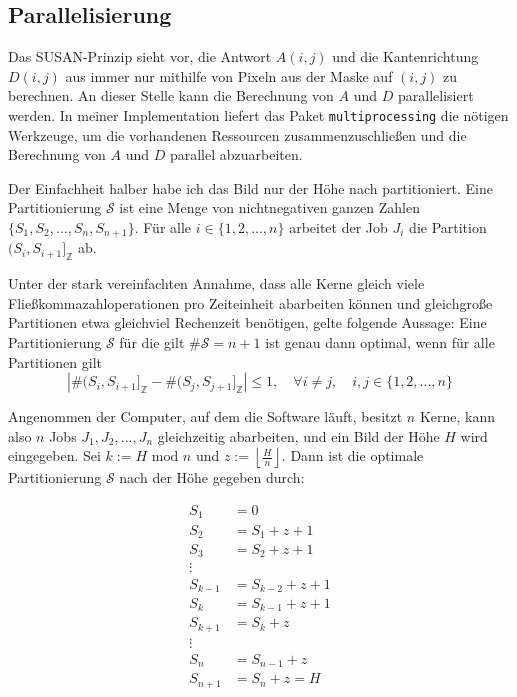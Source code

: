 \documentclass[a4paper, 11pt]{report}
\theoremstyle{definition}
\begin{document}
			\subsection{Parallelisierung}
				Das SUSAN-Prinzip sieht vor, die Antwort $A(i,j)$ und die Kantenrichtung $D(i,j)$ aus  immer nur mithilfe von Pixeln aus der Maske auf $(i,j)$ zu berechnen. An dieser Stelle kann die Berechnung von $A$ und $D$ parallelisiert werden. In meiner Implementation liefert das Paket \texttt{multiprocessing} die nötigen Werkzeuge, um die vorhandenen Ressourcen zusammenzuschließen und die Berechnung von $A$ und $D$ parallel abzuarbeiten.

				Der Einfachheit halber habe ich das Bild nur der Höhe nach partitioniert. Eine Partitionierung $\mathcal{S}$ ist eine Menge von nichtnegativen ganzen Zahlen $\{S_1, S_2, ..., S_n, S_{n+1}\}$. Für alle $i \in \{1,2,...,n\}$ arbeitet der Job $J_i$ die Partition $(S_i, S_{i+1}]_\mathbb{Z}$ ab.

				Unter der stark vereinfachten Annahme, dass alle Kerne gleich viele Fließkommazahloperationen pro Zeiteinheit abarbeiten können und gleichgroße Partitionen etwa gleichviel Rechenzeit benötigen, gelte folgende Aussage: Eine Partitionierung $\mathcal{S}$ für die gilt $\#\mathcal{S} = n+1$ ist genau dann optimal, wenn für alle Partitionen gilt
				$$|\#(S_i, S_{i+1}]_\mathbb{Z} - \#(S_j, S_{j+1}]_\mathbb{Z}| \leq 1, \quad \forall i \neq j, \quad i,j \in \{1,2,...,n\}$$

				Angenommen der Computer, auf dem die Software läuft, besitzt $n$ Kerne, kann also $n$ Jobs $J_1,J_2,...,J_n$ gleichzeitig abarbeiten, und ein Bild der Höhe $H$ wird eingegeben. Sei $k := H \text{ mod } n$ und $z := \left\lfloor \frac{H}{n} \right\rfloor$. Dann ist die optimale Partitionierung $\mathcal{S}$ nach der Höhe gegeben durch:

				\begin{align*}
				S_1 	&= 					0		\\
				S_2 	&= S_1		+	z + 1		\\
				S_3 	&= S_2 		+ 	z + 1		\\
									\vdots			\\
				S_{k-1} &= S_{k-2}	+ 	z + 1		\\
				S_{k}	&= S_{k-1} 	+ 	z + 1		\\
				S_{k+1} &= S_k 		+ 	z			\\
									\vdots			\\
				S_{n} 	&= S_{n-1} 	+ 	z 			\\
				S_{n+1} &= S_{n}	+	z  = H	\\
				\end{align*}
\end{document}
